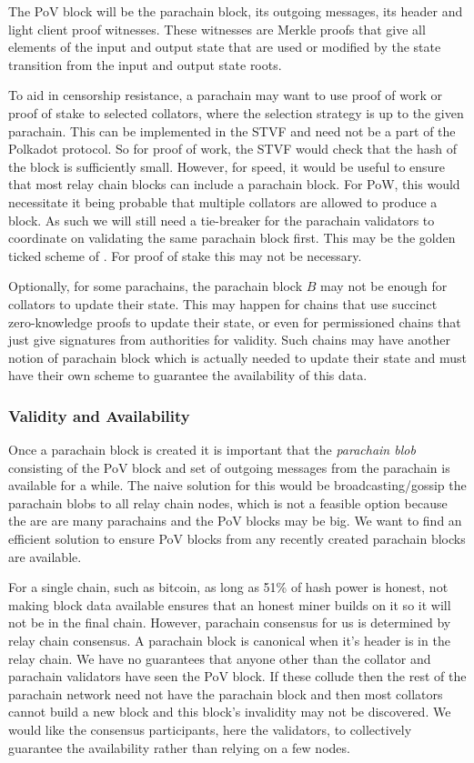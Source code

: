 The PoV block will be the parachain block, its outgoing messages, its header and light client proof witnesses. These witnesses are Merkle proofs that give all elements of the input and output state that are used or modified by the state transition from the input and output state roots.


To aid in censorship resistance, a parachain may want to use proof of work or proof of stake to selected collators, where the selection strategy is up to the given parachain.
This can be implemented in the STVF and need not be a part of the Polkadot protocol. So for proof of work,
the STVF would check that the hash of the block is sufficiently small.
However, for speed, it would be useful to ensure that most relay chain blocks can include a parachain block.
For PoW, this would necessitate it being probable that multiple collators are allowed to produce a block.
As such we will still need a tie-breaker for the parachain validators to coordinate on validating the same parachain block first.
This may be the golden ticked scheme of \cite{2016:Wood:Polkadot}. For proof of stake this may not be necessary.

Optionally, for some parachains, the parachain block $B$ may not be enough for collators to update their state. This may happen for chains that use succinct zero-knowledge proofs to update their state, or even for permissioned chains that just give signatures from authorities for validity. Such chains may have another notion of parachain block which is actually needed to update their state and must have their own scheme to guarantee the availability of this data.





\subsubsection{Validity and Availability} \label{sec:validity-and-availability}
Once a parachain block is created it is important that the {\em parachain blob} consisting of the PoV block and set of outgoing messages from the parachain is available for a while.
The naive solution for this would be broadcasting/gossip the parachain blobs to all relay chain nodes, which is not a feasible option because the are are many parachains and the PoV blocks may be big.
We want to find an efficient solution to ensure PoV blocks from any recently created parachain blocks are available.

For a single chain, such as bitcoin, as long as 51\% of hash power is honest, not making block data available ensures that an honest miner builds on it so it will not be in the final chain. However, parachain consensus for us is determined by relay chain consensus.
A parachain block is canonical when it's header is in the relay chain.
We have no guarantees that anyone other than the collator and parachain validators have seen the PoV block.
If these collude then the rest of the parachain network need not have the parachain block and then most collators cannot build a new block and this block's invalidity may not be discovered.
We would like the consensus participants, here the validators, to collectively guarantee the availability rather than relying on a few nodes.

